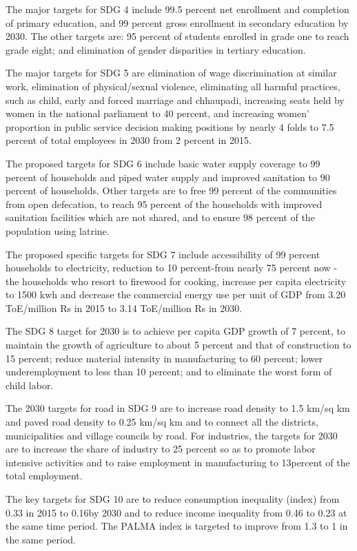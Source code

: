 \documentclass[
  openany]{book}
\begin{document}
The major targets for SDG 4 include 99.5 percent net enrollment and completion of primary education, and 99 percent gross enrollment in secondary education by 2030. The other targets are: 95 percent of students enrolled in grade one to reach grade eight; and elimination of gender disparities in tertiary education.

The major targets for SDG 5 are elimination of wage discrimination at similar work, elimination of physical/sexual violence, eliminating all harmful practices, such as child, early and forced marriage and chhaupadi, increasing seats held by women in the national parliament to 40 percent, and increasing women' proportion in public service decision making positions by nearly 4 folds to 7.5 percent of total employees in 2030 from 2 percent in 2015.

The proposed targets for SDG 6 include basic water supply coverage to 99 percent of households and piped water supply and improved sanitation to 90 percent of households. Other targets are to free 99 percent of the communities from open defecation, to reach 95 percent of the households with improved sanitation facilities which are not shared, and to ensure 98 percent of the population using latrine.

The proposed specific targets for SDG 7 include accessibility of 99 percent households to electricity, reduction to 10 percent-from nearly 75 percent now - the households who resort to firewood for cooking, increase per capita electricity to 1500 kwh and decrease the commercial energy use per unit of GDP from 3.20 ToE/million Rs in 2015 to 3.14 ToE/million Rs in 2030.

The SDG 8 target for 2030 is to achieve per capita GDP growth of 7 percent, to maintain the growth of agriculture to about 5 percent and that of construction to 15 percent; reduce material intensity in manufacturing to 60 percent; lower underemployment to less than 10 percent; and to eliminate the worst form of child labor.

The 2030 targets for road in SDG 9 are to increase road density to 1.5 km/sq km and paved road density to 0.25 km/sq km and to connect all the districts, municipalities and village councils by road. For industries, the targets for 2030 are to increase the share of industry to 25 percent so as to promote labor intensive activities and to raise employment in manufacturing to 13percent of the total employment.

The key targets for SDG 10 are to reduce consumption inequality (index) from 0.33 in 2015 to 0.16by 2030 and to reduce income inequality from 0.46 to 0.23 at the same time period. The PALMA index is targeted to improve from 1.3 to 1 in the same period.
\end{document}

